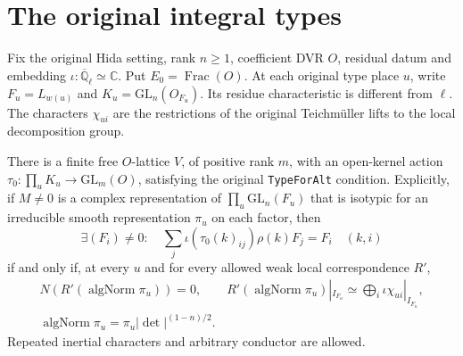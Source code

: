 \section{The original integral types}
\label{sec:selmer-integral-type}

Fix the original Hida setting, rank \(n\geq1\), coefficient DVR \(O\),
residual datum and embedding
\(\iota:\overline{\mathbb Q}_\ell\simeq\mathbb C\).
Put \(E_0=\operatorname{Frac}(O)\).
At each original type place \(u\), write
\(F_u=L_{w(u)}\) and \(K_u=\mathrm{GL}_n(O_{F_u})\).
Its residue characteristic is different from \(\ell\).
The characters \(\chi_{ui}\) are the restrictions of the original
Teichm\"uller lifts to the local decomposition group.

\begin{theorem}
\label{thm:original-integral-type}
There is a finite free \(O\)-lattice \(V\), of positive rank \(m\),
with an open-kernel action
\(\tau_0:\prod_uK_u\to\mathrm{GL}_m(O)\), satisfying the original
\texttt{TypeForAlt} condition.
Explicitly, if \(M\ne0\) is a complex representation of
\(\prod_u\mathrm{GL}_n(F_u)\) that is isotypic for an irreducible
smooth representation \(\pi_u\) on each factor, then
\[
 \exists(F_i)\ne0:\quad
 \sum_j\iota(\tau_0(k)_{ij})\rho(k)F_j=F_i\quad(k,i)
\]
if and only if, at every \(u\) and for every allowed weak local
correspondence \(R'\),
\[
 \begin{gathered}
 N\!\left(R'(\operatorname{algNorm}\pi_u)\right)=0,\qquad
 R'(\operatorname{algNorm}\pi_u)|_{I_{F_u}}
       \simeq\bigoplus_i\iota\chi_{ui}|_{I_{F_u}},\\
 \operatorname{algNorm}\pi_u=\pi_u|\det|^{(1-n)/2}.
 \end{gathered}
\]
Repeated inertial characters and arbitrary conductor are allowed.
\end{theorem}

